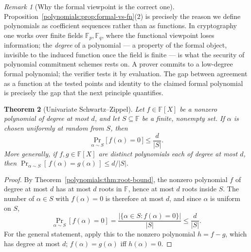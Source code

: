 \documentclass[11pt,a4paper]{article}
\newtheorem{theorem}{Theorem}[section]
\theoremstyle{definition}
\theoremstyle{remark}
\newtheorem{remark}[theorem]{Remark}
\newcommand{\F}{\ensuremath{\mathbb{F}}}
\newcommand{\Fp}{\ensuremath{\mathbb{F}_{p}}}
\newcommand{\Fq}{\ensuremath{\mathbb{F}_{q}}}
\begin{document}
\begin{remark}[Why the formal viewpoint is the correct one]
\label{polynomials:rem:formal-right}
Proposition~\ref{polynomials:prop:formal-vs-fn}(2) is precisely the reason
we define polynomials as coefficient sequences rather than as functions. In
cryptography one works over finite fields \(\Fp, \Fq\), where the functional
viewpoint loses information; the \emph{degree} of a polynomial — a property of
the formal object, invisible to the induced function once the field is finite —
is what the security of polynomial commitment schemes rests on. A prover commits
to a low-degree formal polynomial; the verifier tests it by evaluation. The gap
between agreement as a function at the tested points and identity to the claimed
formal polynomial is precisely the gap that the next principle quantifies.
\end{remark}

\begin{theorem}[Univariate Schwartz--Zippel]\label{polynomials:thm:schwartz-zippel}
Let \(f \in \F[X]\) be a nonzero polynomial of degree at most \(d\), and let
\(S \subseteq \F\) be a finite, nonempty set. If \(\alpha\) is chosen uniformly
at random from \(S\), then
\begin{equation}\label{polynomials:eq:schwartz-zippel}
  \Pr_{\alpha \sim S}\bigl[\, f(\alpha) = 0 \,\bigr] \le \frac{d}{|S|}.
\end{equation}
More generally, if \(f, g \in \F[X]\) are distinct polynomials each of degree at
most \(d\), then \(\Pr_{\alpha \sim S}[\, f(\alpha) = g(\alpha)\,] \le d / |S|\).
\end{theorem}

\begin{proof}
By Theorem~\ref{polynomials:thm:root-bound}, the nonzero polynomial \(f\) of
degree at most \(d\) has at most \(d\) roots in \(\F\), hence at most \(d\) roots
inside \(S\). The number of \(\alpha \in S\) with \(f(\alpha) = 0\) is therefore
at most \(d\), and since \(\alpha\) is uniform on \(S\),
\[
  \Pr_{\alpha \sim S}[f(\alpha) = 0]
    = \frac{|\{\alpha \in S : f(\alpha) = 0\}|}{|S|}
    \le \frac{d}{|S|}.
\]
For the general statement, apply this to the nonzero polynomial \(h = f - g\),
which has degree at most \(d\); \(f(\alpha) = g(\alpha)\) iff \(h(\alpha) = 0\).
\end{proof}
\end{document}
